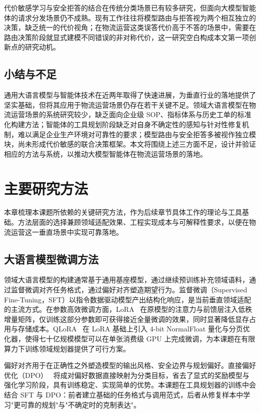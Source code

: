 代价敏感学习与安全拒答的结合在传统分类场景已有较多研究，但面向大模型智能体的请求分发场景仍不成熟。现有工作往往将模型路由与拒答视为两个相互独立的决策，缺乏统一的代价视角；在物流运营这类误答代价高于不答的场景中，需要在路由决策阶段就显式建模不同错误的非对称代价，这一研究空白构成本文第一项创新点的研究动机。

\section{小结与不足}

通用大语言模型与智能体技术在近两年取得了快速进展，为垂直行业的落地提供了坚实基础，但将其应用于物流运营场景仍存在若干关键不足。领域大语言模型在物流运营场景的系统研究较少，缺乏面向企业级 SOP、指标体系与历史工单的标准化构建方法；智能体的工具规划阶段缺乏对自身不确定性的感知与针对性修复机制，难以满足企业生产环境对可靠性的要求；模型路由与安全拒答多被视作独立模块，尚未形成代价敏感的联合决策框架。本文将围绕上述三方面不足，设计并验证相应的方法与系统，以推动大模型智能体在物流运营场景的落地。


\chapter{主要研究方法}

本章梳理本课题所依赖的关键研究方法，作为后续章节具体工作的理论与工具基础。方法层面的选择兼顾领域适配效果、工程实现成本与可解释性要求，以便在物流运营这一垂直场景中实现可靠落地。

\section{大语言模型微调方法}

领域大语言模型的构建通常基于通用基座模型，通过继续预训练补充领域语料，通过监督微调对齐任务格式，通过偏好对齐塑造期望行为。监督微调（Supervised Fine-Tuning，SFT）以指令数据驱动模型产出结构化响应，是当前垂直领域适配的主流方式。在参数高效微调方面，LoRA~\cite{lora} 在原模型的注意力与前馈层注入低秩增量矩阵，仅训练这部分参数即可获得接近全量微调的效果，同时显著降低显存占用与存储成本。QLoRA~\cite{qlora} 在 LoRA 基础上引入 4-bit NormalFloat 量化与分页优化器，使得七十亿规模模型可以在单张消费级 GPU 上完成微调，为本课题在有限算力下训练领域规划器提供了可行方案。

偏好对齐用于在正确性之外塑造模型的输出风格、安全边界与规划偏好。直接偏好优化（DPO）~\cite{dpo} 将成对偏好数据直接映射为分类目标，省去了显式的奖励模型与强化学习阶段，具有训练稳定、实现简单的优势。本课题在工具规划器的训练中会结合 SFT 与 DPO：前者建立基础的任务格式与调用范式，后者从修复样本中学习"更可靠的规划"与"不确定时的克制表达"。

